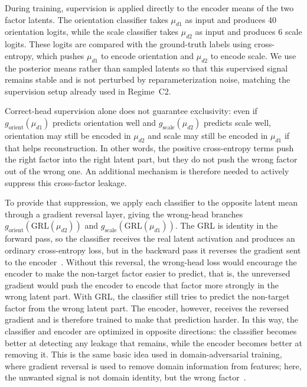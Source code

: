 During training, supervision is applied directly to the encoder means of the two factor latents.
The orientation classifier takes \(\mu_{d1}\) as input and produces 40 orientation logits, while
the scale classifier takes \(\mu_{d2}\) as input and produces 6 scale logits. These logits are
compared with the ground-truth labels using cross-entropy, which pushes \(\mu_{d1}\) to encode
orientation and \(\mu_{d2}\) to encode scale. We use the posterior means rather than sampled
latents so that this supervised signal remains stable and is not perturbed by reparameterization
noise, matching the supervision setup already used in Regime~C2.

Correct-head supervision alone does not guarantee exclusivity: even if
\(g_{\mathrm{orient}}(\mu_{d1})\) predicts orientation well and
\(g_{\mathrm{scale}}(\mu_{d2})\) predicts scale well, orientation may still be encoded in
\(\mu_{d2}\) and scale may still be encoded in \(\mu_{d1}\) if that helps reconstruction. In other
words, the positive cross-entropy terms push the right factor into the right latent part, but they
do not push the wrong factor out of the wrong one. An additional mechanism is therefore needed to
actively suppress this cross-factor leakage.

To provide that suppression, we apply each classifier to the opposite latent mean through a
gradient reversal layer, giving the wrong-head branches
\(g_{\mathrm{orient}}(\mathrm{GRL}(\mu_{d2}))\) and
\(g_{\mathrm{scale}}(\mathrm{GRL}(\mu_{d1}))\). The GRL is identity in the forward pass, so the
classifier receives the real latent activation and produces an ordinary cross-entropy loss, but in
the backward pass it reverses the gradient sent to the encoder~\citep{ganin2015unsupervised,
ganin2016domain}. Without this reversal, the wrong-head loss would encourage the encoder to make the
non-target factor easier to predict, that is, the unreversed gradient would push the encoder to
encode that factor more strongly in the wrong latent part. 
With GRL, the classifier still tries to predict the non-target factor from the wrong latent part.
The encoder, however, receives the reversed gradient and is therefore trained to make that
prediction harder. In this way, the classifier and encoder are optimized in opposite directions: the
classifier becomes better at detecting any leakage that remains, while the encoder becomes better at
removing it. This is the same basic idea used in domain-adversarial training, where gradient
reversal is used to remove domain information from features; here, the unwanted signal is not domain
identity, but the wrong factor~\citep{attribute_disentanglement}.

